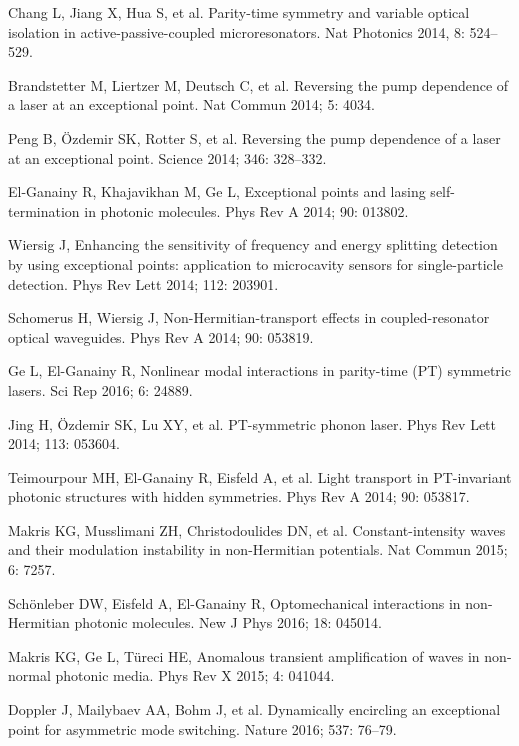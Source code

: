 \documentclass[12pt]{iopart}
\begin{document}
\begin{thebibliography}{100}
	 Chang L, Jiang X, Hua S, et al. Parity-time symmetry and variable optical isolation in active-passive-coupled microresonators. Nat Photonics 2014, 8: 524--529.
	
	 Brandstetter M, Liertzer M, Deutsch C, et al.
	Reversing the pump dependence of a laser at an exceptional point.
	Nat Commun 2014;  5: 4034.
	
	 Peng B, \"Ozdemir SK, Rotter S, et al.
	Reversing the pump dependence of a laser at an exceptional point.
	Science 2014;   346: 328--332.
	
	 El-Ganainy R, Khajavikhan M, Ge L,
	Exceptional points and lasing self-termination in photonic molecules.
	Phys Rev A 2014;   90: 013802.
	
	 Wiersig J,
	Enhancing the sensitivity of frequency and energy splitting detection by using exceptional points: application to microcavity sensors for single-particle detection.
	Phys Rev Lett 2014;   112: 203901.
	
	 Schomerus H, Wiersig J,
	Non-Hermitian-transport effects in coupled-resonator optical waveguides.
	Phys Rev A 2014;  90: 053819.	
	
	 Ge L, El-Ganainy R,
	Nonlinear modal interactions in parity-time (PT) symmetric lasers.
	Sci Rep 2016;  6: 24889.
	
	 Jing H, \"Ozdemir SK, Lu XY, et al.
	 PT-symmetric phonon laser.
	Phys Rev Lett 2014;  113: 053604.
	
	 Teimourpour MH, El-Ganainy R, Eisfeld A, et al.
	Light transport in  PT-invariant photonic structures with hidden symmetries.
	Phys Rev A 2014;   90: 053817.
	
	 Makris KG, Musslimani ZH, Christodoulides DN, et al.
	Constant-intensity waves and their modulation instability in non-Hermitian potentials.
	Nat Commun 2015;   6: 7257.
	
	 Sch\"onleber DW, Eisfeld A, El-Ganainy R,
	Optomechanical interactions in non-Hermitian photonic molecules.
	New J Phys 2016;   18: 045014.
	
	 Makris KG, Ge L, T\"ureci HE,
	Anomalous transient amplification of waves in non-normal photonic media.
	Phys Rev X 2015;   4: 041044.	
	
	 Doppler J, Mailybaev AA, Bohm J, et al.
	Dynamically encircling an exceptional point for asymmetric mode switching.
	Nature 2016;   537: 76--79.
	

\end{thebibliography}
\end{document}
